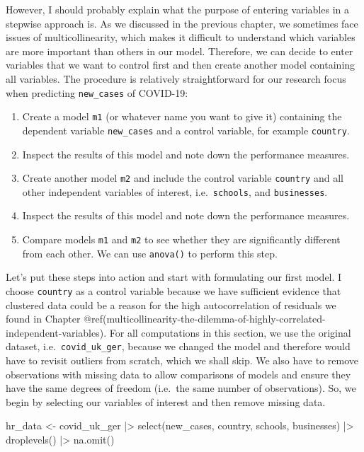 \documentclass[
  letterpaper,
]{krantz}
\makeatletter
\newenvironment{Shaded}{\begin{snugshade}}{\end{snugshade}}
\newcommand{\FunctionTok}[1]{\textcolor[rgb]{0.28,0.35,0.67}{#1}}
\newcommand{\NormalTok}[1]{\textcolor[rgb]{0.00,0.23,0.31}{#1}}
\newcommand{\OtherTok}[1]{\textcolor[rgb]{0.00,0.23,0.31}{#1}}
\newcommand{\SpecialCharTok}[1]{\textcolor[rgb]{0.37,0.37,0.37}{#1}}
\providecommand{\tightlist}{%
  \setlength{\itemsep}{0pt}\setlength{\parskip}{0pt}}\usepackage{longtable,booktabs,array}
\newenvironment{kframe}{%
\medskip{}
\setlength{\fboxsep}{.8em}
 \def\at@end@of@kframe{}%
 \ifinner\ifhmode%
  \def\at@end@of@kframe{\end{minipage}}%
  \begin{minipage}{\columnwidth}%
 \fi\fi%
 \def\FrameCommand##1{\hskip\@totalleftmargin \hskip-\fboxsep
 \colorbox{shadecolor}{##1}\hskip-\fboxsep
     \hskip-\linewidth \hskip-\@totalleftmargin \hskip\columnwidth}%
 \MakeFramed {\advance\hsize-\width
   \@totalleftmargin\z@ \linewidth\hsize
   \@setminipage}}%
 {\par\unskip\endMakeFramed%
 \at@end@of@kframe}
\renewenvironment{Shaded}{\begin{kframe}}{\end{kframe}}
\makeatother
\begin{document}
However, I should probably explain what the purpose of entering
variables in a stepwise approach is. As we discussed in the previous
chapter, we sometimes face issues of multicollinearity, which makes it
difficult to understand which variables are more important than others
in our model. Therefore, we can decide to enter variables that we want
to control first and then create another model containing all variables.
The procedure is relatively straightforward for our research focus when
predicting \texttt{new\_cases} of COVID-19:

\begin{enumerate}
\def\labelenumi{\arabic{enumi}.}
\tightlist
\item
  Create a model \texttt{m1} (or whatever name you want to give it)
  containing the dependent variable \texttt{new\_cases} and a control
  variable, for example \texttt{country}.
\item
  Inspect the results of this model and note down the performance
  measures.
\item
  Create another model \texttt{m2} and include the control variable
  \texttt{country} and all other independent variables of interest,
  i.e.~\texttt{schools}, and \texttt{businesses}.
\item
  Inspect the results of this model and note down the performance
  measures.
\item
  Compare models \texttt{m1} and \texttt{m2} to see whether they are
  significantly different from each other. We can use \texttt{anova()}
  to perform this step.
\end{enumerate}

Let's put these steps into action and start with formulating our first
model. I choose \texttt{country} as a control variable because we have
sufficient evidence that clustered data could be a reason for the high
autocorrelation of residuals we found in Chapter
@ref(multicollinearity-the-dilemma-of-highly-correlated-independent-variables).
For all computations in this section, we use the original dataset,
i.e.~\texttt{covid\_uk\_ger}, because we changed the model and therefore
would have to revisit outliers from scratch, which we shall skip. We
also have to remove observations with missing data to allow comparisons
of models and ensure they have the same degrees of freedom (i.e.~the
same number of observations). So, we begin by selecting our variables of
interest and then remove missing data.

\begin{Shaded}
\begin{Highlighting}[]
\NormalTok{hr\_data }\OtherTok{\textless{}{-}}
\NormalTok{  covid\_uk\_ger }\SpecialCharTok{|\textgreater{}}
  \FunctionTok{select}\NormalTok{(new\_cases, country, schools, businesses) }\SpecialCharTok{|\textgreater{}}
  \FunctionTok{droplevels}\NormalTok{() }\SpecialCharTok{|\textgreater{}}
  \FunctionTok{na.omit}\NormalTok{()}
\end{Highlighting}
\end{Shaded}
\end{document}
